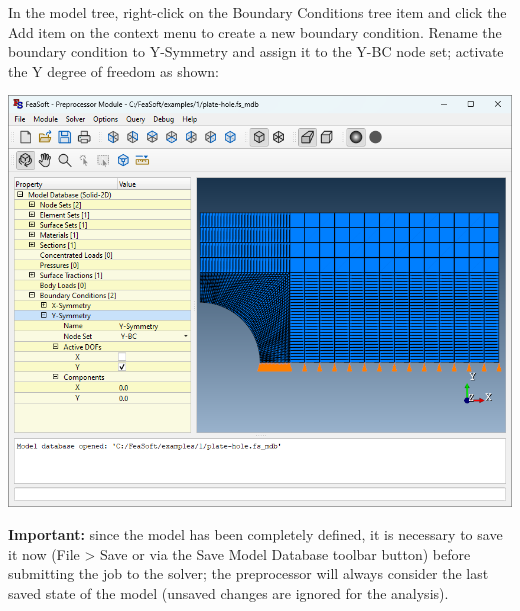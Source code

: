 \documentclass[
    11pt,        %
    a4paper,     %
    final,       %
    fleqn,       %
    notitlepage, %
    onecolumn,   %
    oneside,     %
]{article}
\begin{document}
In the model tree, right-click on the Boundary Conditions tree item and click the Add item on the context menu to create a new boundary condition. Rename the boundary condition to Y-Symmetry and assign it to the Y-BC node set; activate the Y degree of freedom as shown:
\begin{center}
\end{center}
\begin{center}
    \includegraphics[scale=0.5]{fig/ui-1-17.png}
\end{center}

\textbf{Important:} since the model has been completely defined, it is necessary to save it now (File > Save or via the Save Model Database toolbar button) before submitting the job to the solver; the preprocessor will always consider the last saved state of the model (unsaved changes are ignored for the analysis).
\end{document}
